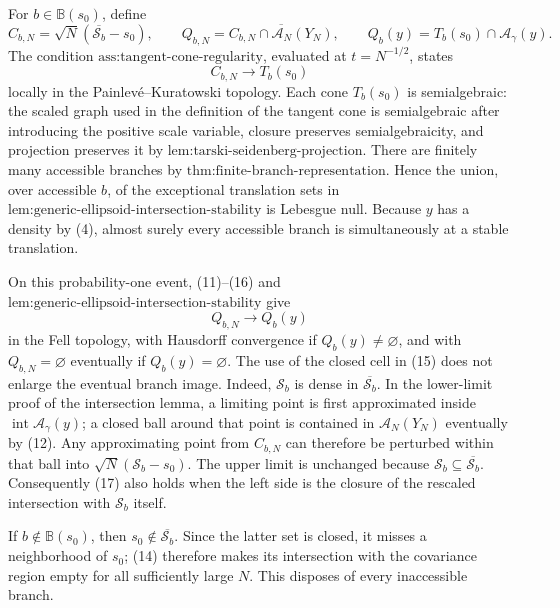 For \(b\in\mathbb B(s_0)\), define
\[
 C_{b,N}=\sqrt N(\overline{\mathcal S_b}-s_0),
 \qquad
 Q_{b,N}=\overline{C_{b,N}\cap\mathcal A_N(Y_N)},
 \qquad
 Q_b(y)=T_b(s_0)\cap\mathcal A_\gamma(y).
 \tag{15}
\]
The condition \(\text{ass:tangent-cone-regularity}\), evaluated at \(t=N^{-1/2}\), states
\[
 C_{b,N}\longrightarrow T_b(s_0)
 \tag{16}
\]
locally in the Painlev\'e--Kuratowski topology.  Each cone \(T_b(s_0)\) is semialgebraic: the scaled graph used in the definition of the tangent cone is semialgebraic after introducing the positive scale variable, closure preserves semialgebraicity, and projection preserves it by \(\text{lem:tarski-seidenberg-projection}\).  There are finitely many accessible branches by \(\text{thm:finite-branch-representation}\).  Hence the union, over accessible \(b\), of the exceptional translation sets in \(\text{lem:generic-ellipsoid-intersection-stability}\) is Lebesgue null.  Because \(y\) has a density by (4), almost surely every accessible branch is simultaneously at a stable translation.

On this probability-one event, (11)--(16) and \(\text{lem:generic-ellipsoid-intersection-stability}\) give
\[
 Q_{b,N}\longrightarrow Q_b(y)
 \tag{17}
\]
in the Fell topology, with Hausdorff convergence if \(Q_b(y)\ne\varnothing\), and with \(Q_{b,N}=\varnothing\) eventually if \(Q_b(y)=\varnothing\).  The use of the closed cell in (15) does not enlarge the eventual branch image.  Indeed, \(\mathcal S_b\) is dense in \(\overline{\mathcal S_b}\).  In the lower-limit proof of the intersection lemma, a limiting point is first approximated inside \(\operatorname{int}\mathcal A_\gamma(y)\); a closed ball around that point is contained in \(\mathcal A_N(Y_N)\) eventually by (12).  Any approximating point from \(C_{b,N}\) can therefore be perturbed within that ball into \(\sqrt N(\mathcal S_b-s_0)\).  The upper limit is unchanged because \(\mathcal S_b\subseteq\overline{\mathcal S_b}\).  Consequently (17) also holds when the left side is the closure of the rescaled intersection with \(\mathcal S_b\) itself.

If \(b\notin\mathbb B(s_0)\), then \(s_0\notin\overline{\mathcal S_b}\).  Since the latter set is closed, it misses a neighborhood of \(s_0\); (14) therefore makes its intersection with the covariance region empty for all sufficiently large \(N\).  This disposes of every inaccessible branch.

